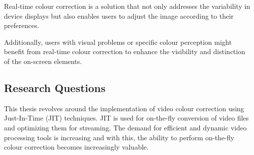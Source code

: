 \documentclass[12pt,a4paper]{article}
\begin{document}
Real-time colour correction is a solution that not only addresses the variability in device displays but also enables users to adjust the image according to their preferences.

Additionally, users with visual problems or specific colour perception might benefit from real-time colour correction to enhance the visibility and distinction of the on-screen elements. 






















\subsection{Research Questions} \label{subsection:research%
	TODOquestions}


This thesis revolves around the implementation of video colour correction using Just-In-Time (JIT) techniques. 	
JIT is used for on-the-fly conversion of video files and optimizing them for streaming. 
The demand for efficient and dynamic video processing tools is increasing and with this, the ability to perform on-the-fly colour correction becomes increasingly valuable. 
\end{document}
